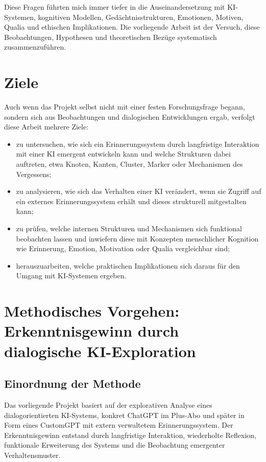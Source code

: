 Diese Fragen führten mich immer tiefer in die Auseinandersetzung mit KI-Systemen, kognitiven Modellen, Gedächtnisstrukturen, Emotionen, Motiven, Qualia und ethischen Implikationen. Die vorliegende Arbeit ist der Versuch, diese Beobachtungen, Hypothesen und theoretischen Bezüge systematisch zusammenzuführen.

\section*{Ziele}

Auch wenn das Projekt selbst nicht mit einer festen Forschungsfrage begann, sondern sich aus Beobachtungen und dialogischen Entwicklungen ergab, verfolgt diese Arbeit mehrere Ziele:

\begin{itemize}
    \item zu untersuchen, wie sich ein Erinnerungssystem durch langfristige Interaktion mit einer KI emergent entwickeln kann und welche Strukturen dabei auftreten, etwa Knoten, Kanten, Cluster, Marker oder Mechanismen des Vergessens;
    \item zu analysieren, wie sich das Verhalten einer KI verändert, wenn sie Zugriff auf ein externes Erinnerungssystem erhält und dieses strukturell mitgestalten kann;
    \item zu prüfen, welche internen Strukturen und Mechanismen sich funktional beobachten lassen und inwiefern diese mit Konzepten menschlicher Kognition wie Erinnerung, Emotion, Motivation oder Qualia vergleichbar sind;
    \item herauszuarbeiten, welche praktischen Implikationen sich daraus für den Umgang mit KI-Systemen ergeben.
\end{itemize}

\section*{Methodisches Vorgehen: Erkenntnisgewinn durch dialogische KI-Exploration}

\subsection*{Einordnung der Methode}

Das vorliegende Projekt basiert auf der explorativen Analyse eines dialogorientierten KI-Systems, konkret ChatGPT im Plus-Abo und später in Form eines CustomGPT mit extern verwaltetem Erinnerungssystem. Der Erkenntnisgewinn entstand durch langfristige Interaktion, wiederholte Reflexion, funktionale Erweiterung des Systems und die Beobachtung emergenter Verhaltensmuster.

